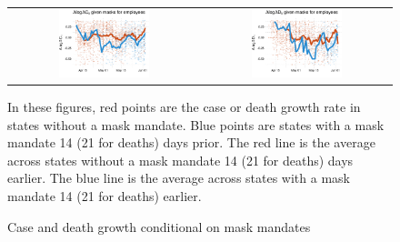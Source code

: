 \documentclass[11pt,reqno,letter]{amsart}
\theoremstyle{definition}
\begin{document}
\begin{figure}[ht]
  \caption{Case and death growth conditional on mask mandates \label{fig:masks}}\vspace{0.2cm}
 \begin{minipage}{\linewidth}
    \centering
    \begin{tabular}{cc}
      \includegraphics[width=0.5\textwidth]{tables_and_figures/pmaskbus-cases-14}
      &
        \includegraphics[width=0.5\textwidth]{tables_and_figures/pmaskbus-deaths-21}
    \end{tabular}
    \begin{flushleft}
      \scriptsize In these figures, red points are the case or death
      growth rate in states without a mask mandate. Blue points are
      states with a mask mandate 14 (21 for deaths) days prior. The
      red line is the average across states without a mask mandate 14
      (21 for deaths) days earlier. The blue line is the average
      across states with a mask mandate 14 (21 for deaths) earlier.
    \end{flushleft}
  \end{minipage}
\end{figure}
\end{document}
